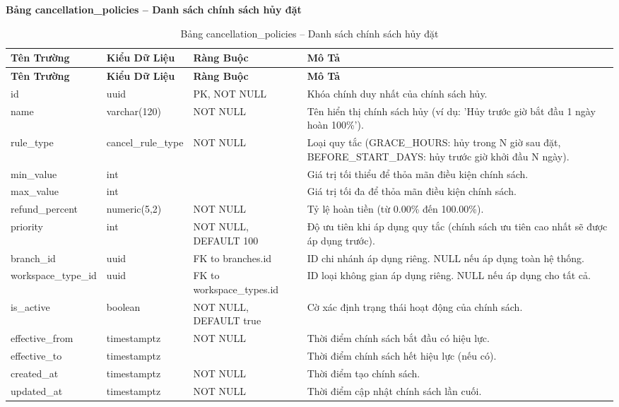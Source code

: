 \textbf{Bảng cancellation\_\allowbreak policies -- Danh sách chính sách hủy đặt}
\label{table:cancellation_policies}
\begin{longtable}{|p{3cm}|p{2.5cm}|p{3.5cm}|p{5cm}|}
\caption{Bảng cancellation\_\allowbreak policies -- Danh sách chính sách hủy đặt} \\
\hline
\textbf{Tên Trường} & \textbf{Kiểu Dữ Liệu} & \textbf{Ràng Buộc} & \textbf{Mô Tả} \\
\hline
\endfirsthead
\hline
\textbf{Tên Trường} & \textbf{Kiểu Dữ Liệu} & \textbf{Ràng Buộc} & \textbf{Mô Tả} \\
\hline
\endhead
id & uuid & PK, NOT NULL & Khóa chính duy nhất của chính sách hủy. \\
\hline
name & varchar(120) & NOT NULL & Tên hiển thị chính sách hủy (ví dụ: 'Hủy trước giờ bắt đầu 1 ngày hoàn 100\%'). \\
\hline
rule\_type & cancel\_rule\_type & NOT NULL & Loại quy tắc (GRACE\_HOURS: hủy trong N giờ sau đặt, BEFORE\_START\_DAYS: hủy trước giờ khởi đầu N ngày). \\
\hline
min\_value & int & & Giá trị tối thiểu để thỏa mãn điều kiện chính sách. \\
\hline
max\_value & int & & Giá trị tối đa để thỏa mãn điều kiện chính sách. \\
\hline
refund\_percent & numeric(5,2) & NOT NULL & Tỷ lệ hoàn tiền (từ 0.00\% đến 100.00\%). \\
\hline
priority & int & NOT NULL, DEFAULT 100 & Độ ưu tiên khi áp dụng quy tắc (chính sách ưu tiên cao nhất sẽ được áp dụng trước). \\
\hline
branch\_id & uuid & FK to branches.id & ID chi nhánh áp dụng riêng. NULL nếu áp dụng toàn hệ thống. \\
\hline
workspace\_type\_id & uuid & FK to workspace\_\allowbreak types.id & ID loại không gian áp dụng riêng. NULL nếu áp dụng cho tất cả. \\
\hline
is\_active & boolean & NOT NULL, DEFAULT true & Cờ xác định trạng thái hoạt động của chính sách. \\
\hline
effective\_from & timestamptz & NOT NULL & Thời điểm chính sách bắt đầu có hiệu lực. \\
\hline
effective\_to & timestamptz & & Thời điểm chính sách hết hiệu lực (nếu có). \\
\hline
created\_at & timestamptz & NOT NULL & Thời điểm tạo chính sách. \\
\hline
updated\_at & timestamptz & NOT NULL & Thời điểm cập nhật chính sách lần cuối. \\
\end{longtable}

